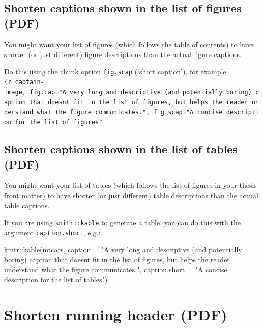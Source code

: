 \documentclass[a4paper, nobind]{templates/ociamthesis}
\newenvironment{Shaded}{\begin{snugshade}}{\end{snugshade}}
\newcommand{\AttributeTok}[1]{\textcolor[rgb]{0.77,0.63,0.00}{#1}}
\newcommand{\FunctionTok}[1]{\textcolor[rgb]{0.00,0.00,0.00}{#1}}
\newcommand{\NormalTok}[1]{#1}
\newcommand{\SpecialCharTok}[1]{\textcolor[rgb]{0.00,0.00,0.00}{#1}}
\newcommand{\StringTok}[1]{\textcolor[rgb]{0.31,0.60,0.02}{#1}}
\renewenvironment{Shaded}
{
  \vspace{10pt}%
  \begin{snugshade}%
}{%
  \end{snugshade}%
  \vspace{8pt}%
}
\begin{document}
\hypertarget{shorten-captions-shown-in-the-list-of-figures-pdf}{%
\subsection{Shorten captions shown in the list of figures (PDF)}\label{shorten-captions-shown-in-the-list-of-figures-pdf}}

You might want your list of figures (which follows the table of contents) to have shorter (or just different) figure descriptions than the actual figure captions.

Do this using the chunk option \texttt{fig.scap} (`short caption'), for example \texttt{\{r\ captain-image,\ fig.cap="A\ very\ long\ and\ descriptive\ (and\ potentially\ boring)\ caption\ that\ doesn\textquotesingle{}t\ fit\ in\ the\ list\ of\ figures,\ but\ helps\ the\ reader\ understand\ what\ the\ figure\ communicates.",\ fig.scap="A\ concise\ description\ for\ the\ list\ of\ figures"}

\hypertarget{shorten-captions-shown-in-the-list-of-tables-pdf}{%
\subsection{Shorten captions shown in the list of tables (PDF)}\label{shorten-captions-shown-in-the-list-of-tables-pdf}}

You might want your list of tables (which follows the list of figures in your thesis front matter) to have shorter (or just different) table descriptions than the actual table captions.

If you are using \texttt{knitr::kable} to generate a table, you can do this with the argument \texttt{caption.short}, e.g.:

\begin{Shaded}
\begin{Highlighting}[]
\NormalTok{knitr}\SpecialCharTok{::}\FunctionTok{kable}\NormalTok{(mtcars,}
              \AttributeTok{caption =} \StringTok{"A very long and descriptive (and potentially}
\StringTok{              boring) caption that doesn\textquotesingle{}t fit in the list of figures,}
\StringTok{              but helps the reader understand what the figure }
\StringTok{              communicates."}\NormalTok{,}
              \AttributeTok{caption.short =} \StringTok{"A concise description for the list of tables"}\NormalTok{)}
\end{Highlighting}
\end{Shaded}

\hypertarget{shorten-running-header-pdf}{%
\section{Shorten running header (PDF)}\label{shorten-running-header-pdf}}
\end{document}
